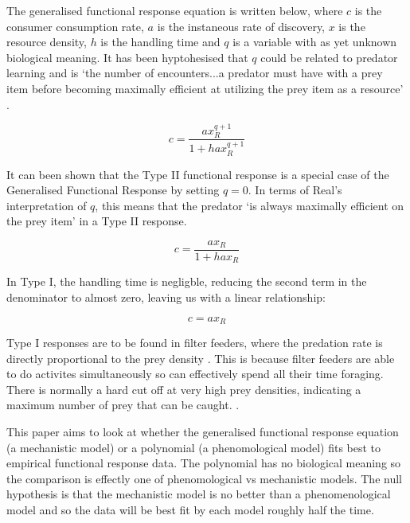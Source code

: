 \documentclass[11pt, a4paper, titlepage]{article}
\begin{document}
The generalised functional response equation is written below, where $c$ is the consumer consumption rate, $a$ is the instaneous rate of discovery, $x$ is the resource density, $h$ is the handling time and $q$ is a variable with as yet unknown biological meaning. It has been hyptohesised that $q$ could be related to predator learning and is `the number of encounters...a predator must have with a prey item before becoming maximally efficient at utilizing the prey item as a resource' \parencite{Real1977}.

\begin{equation}
c = \frac{ax_R^{q + 1}}{1 + hax_R^{q + 1}}
\end{equation}

\bigskip

It can been shown that the Type II functional response is a special case of the Generalised Functional Response by setting $q = 0$. In terms of Real's interpretation of $q$, this means that the predator `is always maximally efficient on the prey item'  \parencite{Real1977} in a Type II response.

\begin{equation}
c = \frac{ax_R}{1 + hax_R}
\end{equation}

\bigskip

 In Type I, the handling time is negligble, reducing the second term in the denominator to almost zero, leaving us with a linear relationship:

\begin{equation}
c = ax_R
\end{equation}

Type I responses are to be found in filter feeders, where the predation rate is directly  proportional to the prey density \parencite{Jeschke2004}. This is because filter feeders are able to do activites simultaneously so can effectively spend all their time foraging. There is normally a hard cut off at very high prey densities, indicating a maximum number of prey that can be caught. \parencite{Jeschke2004}. 

This paper aims to look at whether the generalised functional response equation (a mechanistic model) or a polynomial (a phenomological model) fits best to empirical functional response data. The polynomial has no biological meaning so the comparison is effectly one of phenomological vs mechanistic models. The null hypothesis is that the mechanistic model is no better than a phenomenological model and so the data will be best fit by each model roughly half the time.
\end{document}
